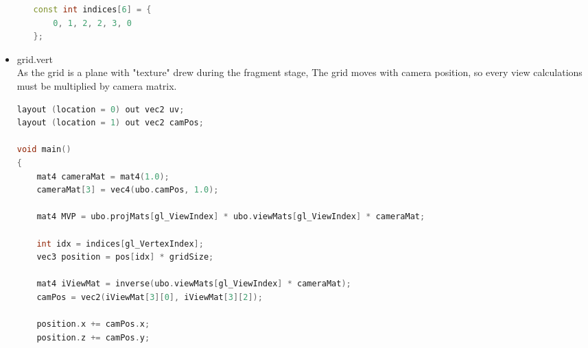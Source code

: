 \begin{itemize}
\begin{itemize}
\begin{lstlisting}[language=c++, caption=Grid shader parameters(./assets/shaders/grid\_params.h)]
const int indices[6] = {
    0, 1, 2, 2, 3, 0
};
\end{lstlisting}
    \end{itemize}
    \item grid.vert\\
    As the grid is a plane with "texture" drew during the fragment stage,
    The grid moves with camera position, so every view calculations must be multiplied by camera matrix.
\begin{lstlisting}[language=c++, caption=(./assets/shaders/grid.vert)]
layout (location = 0) out vec2 uv;
layout (location = 1) out vec2 camPos;

void main()
{
    mat4 cameraMat = mat4(1.0);
    cameraMat[3] = vec4(ubo.camPos, 1.0);

    mat4 MVP = ubo.projMats[gl_ViewIndex] * ubo.viewMats[gl_ViewIndex] * cameraMat;

    int idx = indices[gl_VertexIndex];
    vec3 position = pos[idx] * gridSize;

    mat4 iViewMat = inverse(ubo.viewMats[gl_ViewIndex] * cameraMat);
    camPos = vec2(iViewMat[3][0], iViewMat[3][2]);

    position.x += camPos.x;
    position.z += camPos.y;


\end{lstlisting}
\end{itemize}
